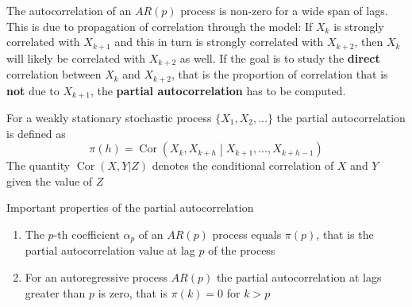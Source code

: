 \documentclass[11pt]{article}
\theoremstyle{definition}
\newcommand*\Cor[1]{\mathop{\text{Cor}}\left(#1\right)}
\begin{document}
The autocorrelation of an $AR(p)$ process is non-zero for a wide span of lags. This is due to propagation of correlation through the model: If $X_k$ is strongly correlated with $X_{k+1}$ and this in turn is strongly correlated with $X_{k+2}$, then $X_k$ will likely be correlated with $X_{k+2}$ as well. If the goal is to study the \textbf{direct} correlation between $X_k$ and $X_{k+2}$, that is the proportion of correlation that is \textbf{not} due to $X_{k+1}$, the \textbf{partial autocorrelation} has to be computed.

\begin{definition}
	For a weakly stationary stochastic process $\{X_1,X_2,\dots\}$ the partial autocorrelation is defined as
	\begin{equation*}
		\pi(h) = \Cor{X_k,X_{k+h}\middle|X_{k+1},\dots,X_{k+h-1}}
	\end{equation*}
	The quantity $\Cor{X,Y|Z}$ denotes the conditional correlation of $X$ and $Y$ given the value of $Z$
\end{definition}
Important properties of the partial autocorrelation
\begin{enumerate}
	\item The $p$-th coefficient $\alpha_p$ of an $AR(p)$ process equals $\pi(p)$, that is the partial autocorrelation value at lag $p$ of the process
	\item For an autoregressive process $AR(p)$ the partial autocorrelation at lags greater than $p$ is zero, that is $\pi(k) = 0$ for $k>p$
\end{enumerate}
\end{document}
